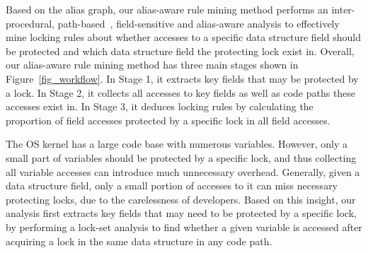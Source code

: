 Based on the alias graph, our alias-aware rule mining method performs an 
inter-procedural, path-based~\cite{Li:ASPLOS22}, field-sensitive and 
alias-aware analysis to effectively mine locking rules about whether accesses 
to a specific data structure field should be protected and which data structure 
field the protecting lock exist in. Overall, our alias-aware rule mining method 
has three main stages shown in Figure~\ref{fig_workflow}. In Stage 1, it 
extracts key fields that may be protected by a lock. In Stage 2, it collects 
all accesses to key fields as well as code paths these accesses exist in. In 
Stage 3, it deduces locking rules by calculating the proportion of field 
accesses protected by a specific lock in all field accesses. 

 The OS kernel has a large code base with 
numerous variables. However, only a small part of variables should be protected 
by a specific lock, and thus collecting all variable accesses can introduce 
much unnecessary overhead. Generally, given a data structure field, only a 
small portion of accesses to it can miss necessary protecting locks, due to the 
carelessness of developers. Based on this insight, our analysis first extracts 
key fields that may need to be protected by a specific lock, by performing a 
lock-set analysis to find whether a given variable is accessed after acquiring 
a lock in the same data structure in any code path.


